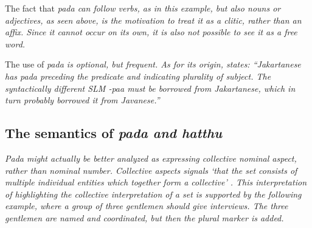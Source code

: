 The fact that \em pada \em can follow verbs, as in this example, but also nouns or adjectives, as seen above, is the motivation to treat it as a clitic, rather than an affix. Since it cannot occur on its own, it is also not possible to see it as a free word.


The use of \em pada \em is optional, but frequent. As for its origin,  \citet[26]{Adelaar1991} states: ``Jakartanese has \em pada \em preceding the predicate and indicating plurality of subject. The syntactically different SLM \em -pa\dotd a \em must be borrowed from Jakartanese, which in turn probably borrowed it from Javanese.''  

% 
%

\subsection{The semantics of \em pada \em and \em hatthu\em}\label{sec:morph:Thesemanticsofpadaandhatthu}

\em Pada \em  might actually be better analyzed as expressing \em collective nominal aspect, \em rather than nominal number. Collective aspects signals `that the set consists of multiple individual entities which together form a collective' \citep[102]{Rijkhoff2002}. This interpretation of highlighting the collective interpretation of a set is supported by the following example, where a group of three gentlemen should give interviews. The three gentlemen are named and coordinated, but then the plural marker is added.





